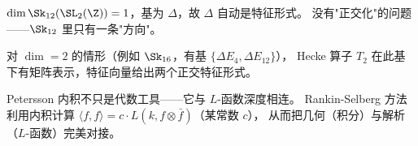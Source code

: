 \begin{example}[$\Sk_{12}$ 的情况]
$\dim \Sk_{12}(\SL_2(\Z)) = 1$，基为 $\Delta$，故 $\Delta$ 自动是特征形式。
没有"正交化"的问题——$\Sk_{12}$ 里只有一条"方向"。

对 $\dim = 2$ 的情形（例如 $\Sk_{16}$，有基 $\{\Delta E_4, \Delta E_{12}\}$），
Hecke 算子 $T_2$ 在此基下有矩阵表示，特征向量给出两个正交特征形式。
\end{example}

\begin{remark}
Petersson 内积不只是代数工具——它与 $L$-函数深度相连。
Rankin-Selberg 方法利用内积计算
$\langle f, f \rangle = c \cdot L(k, f \otimes \bar{f})$（某常数 $c$），
从而把几何（积分）与解析（$L$-函数）完美对接。
\end{remark}
